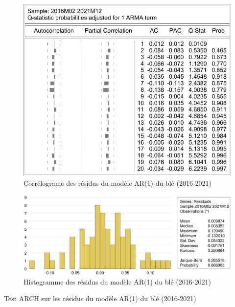 \documentclass[12pt,a4paper]{article}
\begin{document}
\begin{figure}[H]
    \centering
    \includegraphics[]{annexe/4_3_2_modele_cor.pdf}
    \caption{Corrélograme des résidus du modèle AR(1) du blé (2016-2021)}
\end{figure}

\begin{figure}[H]
    \centering
    \includegraphics[width=\textwidth]{annexe/4_3_2_modele_hist.eps}
    \caption{Histogramme des résidus du modèle AR(1) du blé (2016-2021)}
\end{figure}

\begin{table}[H]
    \centering
    \caption{Test ARCH sur les résidus du modèle AR(1) du blé (2016-2021)}
    \sffamily
    \resizebox{0.6\textwidth}{!}{}
\end{table}

\clearpage
{}
\tableofcontents
\clearpage
\printbibliography
\end{document}
